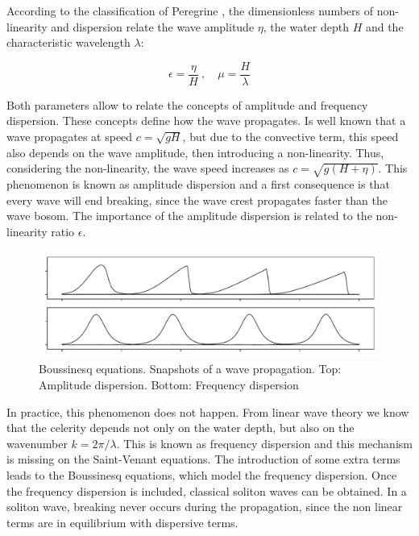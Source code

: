 According to the classification of Peregrine \cite{peregrine1967}, the dimensionless numbers of non-linearity and dispersion relate the wave amplitude $\eta$, the water depth $H$ and the characteristic wavelength $\lambda$:

\begin{equation}
    \epsilon = \frac{\eta}{H} \ ,\quad \mu = \frac{H}{\lambda}
    \label{nonlin_disp_ratios}
\end{equation}

Both parameters allow to relate the concepts of amplitude and frequency dispersion. These concepts define how the wave propagates. Is well known that a wave propagates at speed $c=\sqrt{gH}$, but due to the convective term, this speed also depends on the wave amplitude, then introducing a non-linearity. Thus, considering the non-linearity, the wave speed increases as $c=\sqrt{g(H+\eta)}$. This phenomenon is known as amplitude dispersion and a first consequence is that every wave will end breaking, since the wave crest propagates faster than the wave bosom. The importance of the amplitude dispersion is related to the non-linearity ratio $\epsilon$.


\begin{figure} [ht]
    \centering
    \includegraphics[width=.95\textwidth]{img/eq/boussinesq_dispersion.pdf}
    \caption{Boussinesq equations. Snapshots of a wave propagation. Top: Amplitude dispersion. Bottom: Frequency dispersion}
    \label{boussinesq_dispersion}
\end{figure}


In practice, this phenomenon does not happen. From linear wave theory we know that the celerity depends not only on the water depth, but also on the wavenumber $k=2\pi/\lambda$. This is known as frequency dispersion and this mechanism is missing on the Saint-Venant equations. The introduction of some extra terms leads to the Boussinesq equations, which model the frequency dispersion. Once the frequency dispersion is included, classical soliton waves can be obtained. In a soliton wave, breaking never occurs during the propagation, since the non linear terms are in equilibrium with dispersive terms.



